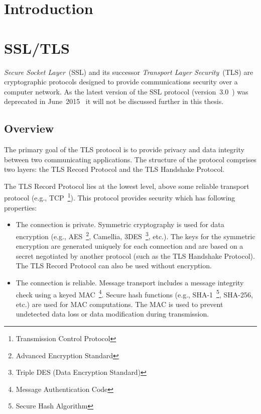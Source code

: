 
\chapter{Introduction}
\chapter{SSL/TLS}
    \textit{Secure Socket Layer}~(SSL) and its successor
    \textit{Transport Layer Security}~(TLS) are cryptographic protocols
    designed to provide communications security over a computer network. As
    the latest version of the SSL protocol (version~3.0~\cite{rfc6101}) was
    deprecated in June~2015~\cite{rfc7568} it will not be discussed
    further in this thesis.
\section{Overview}\label{overview}
    The primary goal of the TLS protocol is to provide privacy and data
    integrity between two communicating applications. The structure of
    the protocol comprises two layers: the TLS Record Protocol and
    the TLS Handshake Protocol.

    The TLS Record Protocol lies at the lowest level, above some reliable
    transport protocol (e.g., TCP~\footnote{Transmission Control Protocol}).
    This protocol provides security which has following properties:
    \begin{itemize}
        \item The connection is private. Symmetric cryptography is used
        for data encryption (e.g., AES~\footnote{Advanced Encryption Standard},
        Camellia, 3DES~\footnote{Triple DES (Data Encryption Standard)}, etc.).
        The keys for the symmetric encryption are generated uniquely
        for each connection
        and are based on a secret negotiated by another protocol
        (such as the TLS Handshake Protocol). The TLS Record Protocol can also
        be used without encryption.
        \item The connection is reliable. Message transport includes
        a message integrity check using a keyed
        MAC~\footnote{Message Authentication Code}. Secure hash functions
        (e.g., SHA-1~\footnote{Secure Hash Algorithm}, SHA-256, etc.) are
        used for MAC computations. The MAC is used to prevent undetected
        data loss or data modification during transmission.
    \end{itemize}


